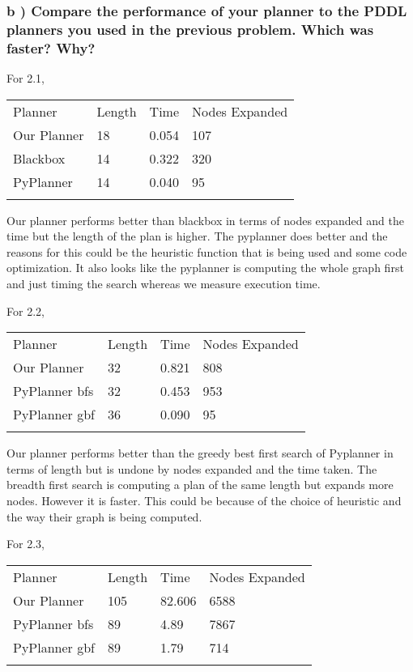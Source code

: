 \documentclass{article}
\begin{document}
    \subsubsection{b ) Compare the performance of your planner to the PDDL planners you
used in the previous problem. Which was faster? Why?}


    For 2.1,

\begin{longtable}[c]{@{}llll@{}}
\toprule\addlinespace
Planner & Length & Time & Nodes Expanded
\\\addlinespace
\midrule\endhead
Our Planner & 18 & 0.054 & 107
\\\addlinespace
Blackbox & 14 & 0.322 & 320
\\\addlinespace
PyPlanner & 14 & 0.040 & 95
\\\addlinespace
\bottomrule
\end{longtable}

Our planner performs better than blackbox in terms of nodes expanded and
the time but the length of the plan is higher. The pyplanner does better
and the reasons for this could be the heuristic function that is being
used and some code optimization. It also looks like the pyplanner is
computing the whole graph first and just timing the search whereas we
measure execution time.

For 2.2,

\begin{longtable}[c]{@{}llll@{}}
\toprule\addlinespace
Planner & Length & Time & Nodes Expanded
\\\addlinespace
\midrule\endhead
Our Planner & 32 & 0.821 & 808
\\\addlinespace
PyPlanner bfs & 32 & 0.453 & 953
\\\addlinespace
PyPlanner gbf & 36 & 0.090 & 95
\\\addlinespace
\bottomrule
\end{longtable}

Our planner performs better than the greedy best first search of
Pyplanner in terms of length but is undone by nodes expanded and the
time taken. The breadth first search is computing a plan of the same
length but expands more nodes. However it is faster. This could be
because of the choice of heuristic and the way their graph is being
computed.

For 2.3,

\begin{longtable}[c]{@{}llll@{}}
\toprule\addlinespace
Planner & Length & Time & Nodes Expanded
\\\addlinespace
\midrule\endhead
Our Planner & 105 & 82.606 & 6588
\\\addlinespace
PyPlanner bfs & 89 & 4.89 & 7867
\\\addlinespace
PyPlanner gbf & 89 & 1.79 & 714
\\\addlinespace
\bottomrule
\end{longtable}
\end{document}
